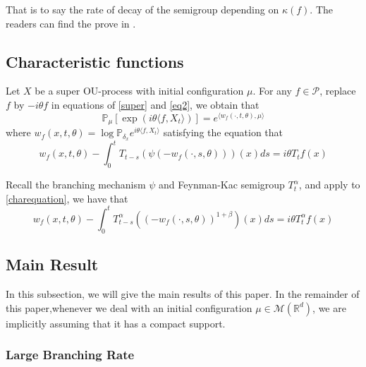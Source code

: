 \documentclass{article}
\begin{document}
That is to say the rate of decay of the semigroup depending on $\kappa(f)$. The readers can find the prove in \cite[Fact 1.2]{MM}. 

\subsection{Characteristic functions}
 Let $X$ be a super OU-process with initial configuration $\mu$. For any $f \in \mathcal{P}$,
replace $f$ by $-i\theta f$ in equations of \eqref{super} and \eqref{eq2}, we obtain that
\begin{equation}\label{characteristic}
    \mathbb{P}_{\mu}\left[\exp(i\theta \langle  f,X_t\rangle)\right]=e^{\langle w_f(\cdot,t,\theta),\mu\rangle}
\end{equation}
where $w_f(x,t,\theta)=\log \mathbb{P}_{\delta_x}e^{i\theta\langle f,X_t\rangle}$ satisfying the equation that
\begin{equation}\label{charequation}
    w_f(x,t,\theta)-\int_0^t T_{t-s} \left(\psi (-w_f(\cdot,s,\theta))\right)(x)ds=i\theta T_tf(x)
\end{equation}

Recall the branching mechanism $\psi$ and Feynman-Kac semigroup $T^{\alpha}_t$, and apply \cite[Proposition 2.9]{ZL} to \eqref{charequation}, we have that
\begin{equation}\label{chareq2}
        w_f(x,t,\theta)-\int_0^t T^{\alpha}_{t-s} \left( (-w_f(\cdot,s,\theta))^{1+\beta}\right)(x)ds=i\theta T^{\alpha}_t f(x)
\end{equation}

\subsection{Main Result}

In this subsection, we will give the main results of this paper. In the remainder of this paper,whenever we deal with an initial configuration $\mu \in \mathcal{M}(\mathbb{R}^d)$, we are implicitly assuming that it has a compact support.
\subsubsection{Large Branching Rate}
\end{document}
